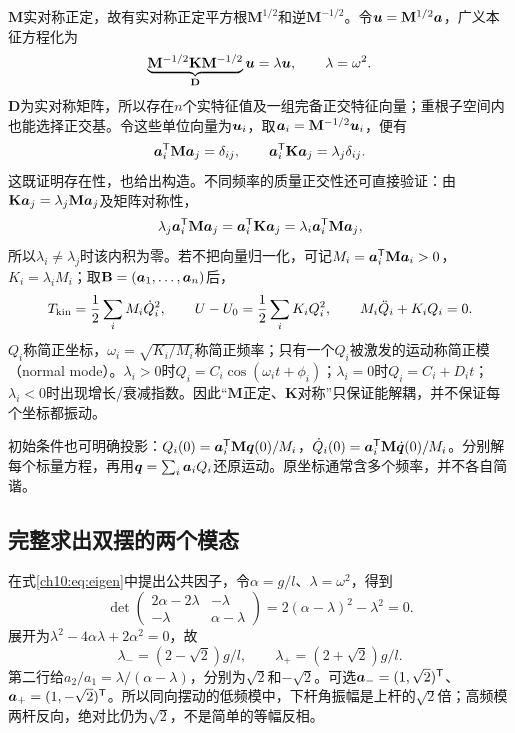 $\mathbf M$实对称正定，故有实对称正定平方根$\mathbf M^{1/2}$和逆$\mathbf M^{-1/2}$。令$\bm{u}=\mathbf M^{1/2}\bm{a}$，广义本征方程化为
\[
 \underbrace{\mathbf M^{-1/2}\mathbf K\mathbf M^{-1/2}}_{\mathbf D}
 \bm{u}=\lambda\bm{u},\qquad\lambda=\omega^2.
\]
$\mathbf D$为实对称矩阵，所以存在$n$个实特征值及一组完备正交特征向量；重根子空间内也能选择正交基。令这些单位向量为$\bm{u}_i$，取$\bm{a}_i=\mathbf M^{-1/2}\bm{u}_i$，便有
\[
 \bm{a}_i^{\mathsf T}\mathbf M\bm{a}_j=\delta_{ij},\qquad
 \bm{a}_i^{\mathsf T}\mathbf K\bm{a}_j=\lambda_j\delta_{ij}.
\]
这既证明存在性，也给出构造。不同频率的质量正交性还可直接验证：由$\mathbf K\bm{a}_j=\lambda_j\mathbf M\bm{a}_j$及矩阵对称性，
\[
 \lambda_j\bm{a}_i^{\mathsf T}\mathbf M\bm{a}_j
 =\bm{a}_i^{\mathsf T}\mathbf K\bm{a}_j
 =\lambda_i\bm{a}_i^{\mathsf T}\mathbf M\bm{a}_j,
\]
所以$\lambda_i\ne\lambda_j$时该内积为零。若不把向量归一化，可记$M_i=\bm{a}_i^{\mathsf T}\mathbf M\bm{a}_i>0$，$K_i=\lambda_iM_i$；取$\mathbf B=(\bm{a}_1,\ldots,\bm{a}_n)$后，
\[
 T_{\rm kin}=\frac12\sum_i M_i\dot Q_i^2,
 \qquad U-U_0=\frac12\sum_i K_iQ_i^2,
 \qquad M_i\ddot Q_i+K_iQ_i=0.
\]
$Q_i$称简正坐标，$\omega_i=\sqrt{K_i/M_i}$称简正频率；只有一个$Q_i$被激发的运动称简正模（normal mode）。$\lambda_i>0$时$Q_i=C_i\cos(\omega_it+\phi_i)$；$\lambda_i=0$时$Q_i=C_i+D_it$；$\lambda_i<0$时出现增长/衰减指数。因此“$\mathbf M$正定、$\mathbf K$对称”只保证能解耦，并不保证每个坐标都振动。

初始条件也可明确投影：$Q_i(0)=\bm{a}_i^{\mathsf T}\mathbf M\bm{q}(0)/M_i$，$\dot Q_i(0)=\bm{a}_i^{\mathsf T}\mathbf M\dot{\bm{q}}(0)/M_i$。分别解每个标量方程，再用$\bm{q}=\sum_i\bm{a}_iQ_i$还原运动。原坐标通常含多个频率，并不各自简谐。

\subsection{完整求出双摆的两个模态}
在式\eqref{ch10:eq:eigen}中提出公共因子，令$\alpha=g/l$、$\lambda=\omega^2$，得到
\[
 \det\begin{pmatrix}2\alpha-2\lambda&-\lambda\\-\lambda&\alpha-\lambda\end{pmatrix}
 =2(\alpha-\lambda)^2-\lambda^2=0.
\]
展开为$\lambda^2-4\alpha\lambda+2\alpha^2=0$，故
\[
 \lambda_-=(2-\sqrt2)g/l,\qquad
 \lambda_+=(2+\sqrt2)g/l.
\]
第二行给$a_2/a_1=\lambda/(\alpha-\lambda)$，分别为$\sqrt2$和$-\sqrt2$。可选$\bm{a}_-=(1,\sqrt2)^{\mathsf T}$、$\bm{a}_+=(1,-\sqrt2)^{\mathsf T}$。所以同向摆动的低频模中，下杆角振幅是上杆的$\sqrt2$倍；高频模两杆反向，绝对比仍为$\sqrt2$，不是简单的等幅反相。

